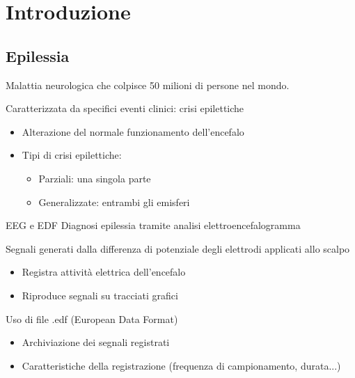 \documentclass[xcolor=x11names,compress, 
]{beamer}
\theoremstyle{definition} \newtheorem{esempio}{Esempio}
\theoremstyle{definition}
\begin{document}
\section{Introduzione}
		
	\subsection{Epilessia}
		\begin{frame}{\subsecname}
			Malattia neurologica che colpisce 50 milioni di persone nel mondo.
			
			 Caratterizzata da specifici eventi clinici: crisi epilettiche
			\begin{itemize}
				\item Alterazione del normale funzionamento dell'encefalo
				\item Tipi di crisi epilettiche:
				 \begin{itemize}
				 	\item Parziali: una singola parte
				 	\item Generalizzate: entrambi gli emisferi
				 \end{itemize}
			\end{itemize}
		\end{frame}
		
		\begin{frame}{EEG e EDF}
			Diagnosi epilessia tramite analisi elettroencefalogramma
			
			Segnali generati dalla differenza di potenziale degli elettrodi applicati allo scalpo
			
			\begin{itemize}
				\item Registra attività elettrica dell'encefalo
				\item Riproduce segnali su tracciati grafici
			\end{itemize}
			
			Uso di file .edf (European Data Format) 
			\begin{itemize}
				\item Archiviazione dei segnali registrati
				\item Caratteristiche della registrazione (frequenza di campionamento, durata...)
			\end{itemize}
		\end{frame}
	
\end{document}
